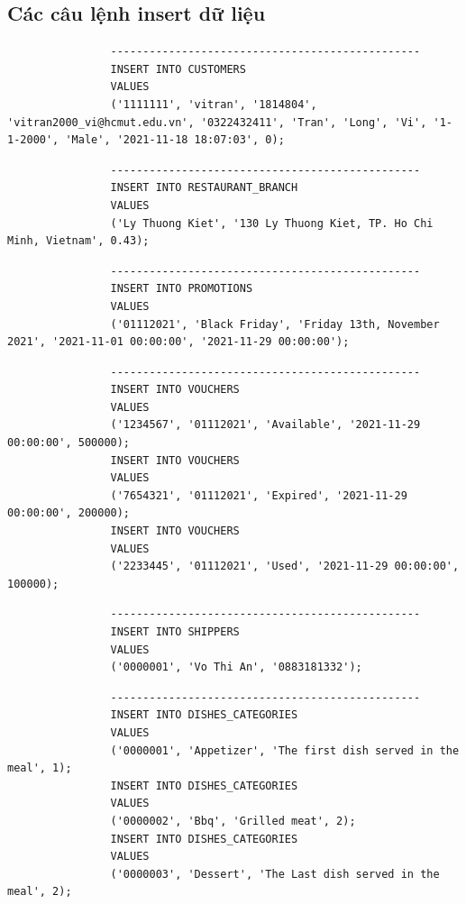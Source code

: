 \documentclass[13pt,a4paper]{article}
\begin{document}
		\subsection{Các câu lệnh insert dữ liệu}
			\begin{lstlisting}
				------------------------------------------------
				INSERT INTO CUSTOMERS
				VALUES
				('1111111', 'vitran', '1814804', 'vitran2000_vi@hcmut.edu.vn', '0322432411', 'Tran', 'Long', 'Vi', '1-1-2000', 'Male', '2021-11-18 18:07:03', 0);
			\end{lstlisting}
			
			\begin{lstlisting}				
				------------------------------------------------
				INSERT INTO RESTAURANT_BRANCH
				VALUES
				('Ly Thuong Kiet', '130 Ly Thuong Kiet, TP. Ho Chi Minh, Vietnam', 0.43);
			\end{lstlisting}
		
			\begin{lstlisting}				
				------------------------------------------------
				INSERT INTO PROMOTIONS
				VALUES
				('01112021', 'Black Friday', 'Friday 13th, November 2021', '2021-11-01 00:00:00', '2021-11-29 00:00:00');				
			\end{lstlisting}
		
			\begin{lstlisting}	
				------------------------------------------------
				INSERT INTO VOUCHERS
				VALUES
				('1234567', '01112021', 'Available', '2021-11-29 00:00:00', 500000);
				INSERT INTO VOUCHERS
				VALUES
				('7654321', '01112021', 'Expired', '2021-11-29 00:00:00', 200000);
				INSERT INTO VOUCHERS
				VALUES
				('2233445', '01112021', 'Used', '2021-11-29 00:00:00', 100000);	
			\end{lstlisting}
	
			\begin{lstlisting}				
				------------------------------------------------
				INSERT INTO SHIPPERS
				VALUES
				('0000001', 'Vo Thi An', '0883181332');			
			\end{lstlisting}
		
			\begin{lstlisting}					
				------------------------------------------------
				INSERT INTO DISHES_CATEGORIES
				VALUES
				('0000001', 'Appetizer', 'The first dish served in the meal', 1);
				INSERT INTO DISHES_CATEGORIES
				VALUES
				('0000002', 'Bbq', 'Grilled meat', 2);
				INSERT INTO DISHES_CATEGORIES
				VALUES
				('0000003', 'Dessert', 'The Last dish served in the meal', 2);	
			\end{lstlisting}
		
\end{document}
